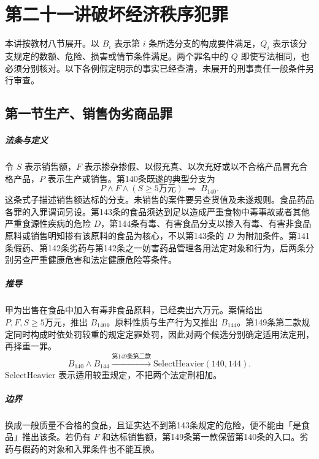 \chapter{第二十一讲\quad 破坏经济秩序犯罪}
\label{lecture:21}
\par

本讲按教材八节展开。以 \(B_i\) 表示第 \(i\) 条所选分支的构成要件满足，\(Q_i\) 表示该分支规定的数额、危险、损害或情节条件满足。两个罪名中的 \(Q\) 即使写法相同，也必须分别核对。以下各例假定明示的事实已经查清，未展开的刑事责任一般条件另行审查。

\section{第一节\quad 生产、销售伪劣商品罪}

\paragraph{法条与定义}
令 \(S\) 表示销售额，\(F\) 表示掺杂掺假、以假充真、以次充好或以不合格产品冒充合格产品，\(P\) 表示生产或销售。第140条既遂的典型分支为
\[
P\land F\land (S\ge 5\text{万元})\ \Longrightarrow\ B_{140}.
\]
这条式子描述销售额达标的分支。未销售的案件要另查货值及未遂规则。食品药品各罪的入罪谓词另设。第143条的食品须达到足以造成严重食物中毒事故或者其他严重食源性疾病的危险 \(D\)，第144条有毒、有害食品分支以掺入有毒、有害非食品原料或销售明知掺有该原料的食品为核心，不以第143条的 \(D\) 为附加条件。第141条假药、第142条劣药与第142条之一妨害药品管理各用法定对象和行为，后两条分别另查严重健康危害和法定健康危险等条件。

\paragraph{推导}
甲为出售在食品中加入有毒非食品原料，已经卖出六万元。案情给出 \(P,F,S\ge5\text{万元}\)，推出 \(B_{140}\)。原料性质与生产行为又推出 \(B_{144}\)。第149条第二款规定同时构成时依处罚较重的规定定罪处罚，因此对两个候选分别确定适用法定刑，再择重一罪。
\[
B_{140}\land B_{144}
\xrightarrow{\text{第149条第二款}}
\mathrm{SelectHeavier}(140,144).
\]
\(\mathrm{SelectHeavier}\) 表示适用较重规定，不把两个法定刑相加。

\paragraph{边界}
换成一般质量不合格的食品，且证实达不到第143条规定的危险，便不能由「是食品」推出该条。若仍有 \(F\) 和达标销售额，第149条第一款保留第140条的入口。劣药与假药的对象和入罪条件也不能互换。

